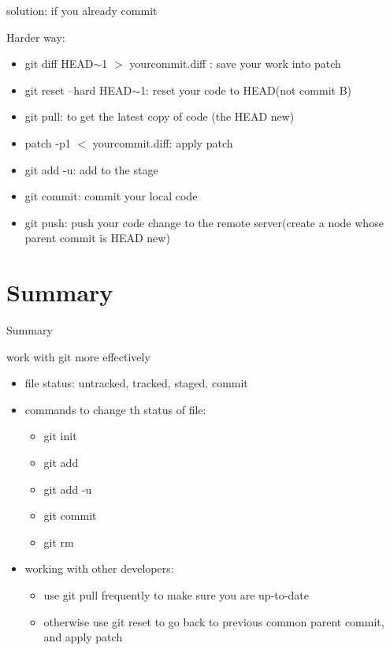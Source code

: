 \documentclass{beamer}
\begin{document}
\begin{frame}{solution: if you already commit}
    \begin{block}{Harder way: }
      \begin{itemize}      
	\item    git diff HEAD$\sim$1 $>$ yourcommit.diff : save your work into patch
	\item    git reset --hard HEAD$\sim$1: reset your code to HEAD(not commit B)
	\item    git pull: to get the latest copy of code (the HEAD new)
	\item    patch -p1 $<$ yourcommit.diff: apply patch
	\item    git add -u: add to the stage	
	\item    git commit: commit your local code
	\item    git push: push your code change to the remote server(create a node whose parent commit is HEAD new)
      \end{itemize}     
    \end{block}
\end{frame}

\section{Summary}

\begin{frame}{Summary}
    \begin{block}{work with git more effectively}
      \begin{itemize}      
	\item    file status: untracked, tracked, staged, commit
	\item    commands to change th status of file:
		\begin{itemize}      
		  \item git init
		  \item git add
		  \item git add -u
		  \item git commit 
		  \item git rm
		\end{itemize}     
	\item    working with other developers:
		\begin{itemize}      
		  \item use git pull frequently to make sure you are up-to-date
		  \item otherwise use git reset to go back to previous common parent commit, and apply patch
		\end{itemize}     	
      \end{itemize}     
    \end{block}
\end{frame}
\end{document}
